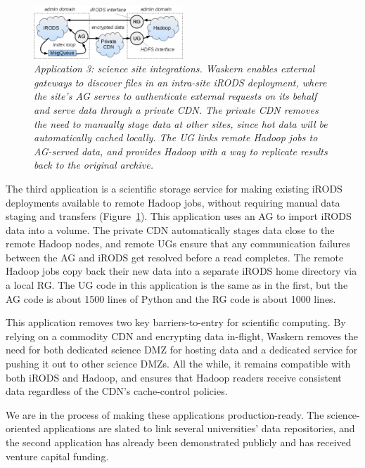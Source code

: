 \begin{figure}[t!]
\centering
\includegraphics[width=0.5\textwidth]{figures/irods-hadoop}
\caption{\it Application 3: science site integrations.  Waskern enables external
   gateways to discover files in an intra-site iRODS deployment, where the
   site's AG serves to authenticate external requests on its behalf and serve
   data through a private CDN.  The private CDN removes the need to manually
   stage data at other sites, since hot data will be automatically cached
   locally.  The UG links remote Hadoop jobs to AG-served data, and provides
   Hadoop with a way to replicate results back to the original archive.}
\label{fig:irods-hadoop}
\end{figure}

The third application is a scientific storage service for making existing iRODS
deployments available to remote Hadoop jobs, without requiring manual data
staging and transfers (Figure~\ref{fig:irods-hadoop}). This application
uses an AG to import iRODS data into a volume. The private
CDN automatically stages data close to the remote Hadoop nodes, and remote UGs
ensure that any communication failures between the AG and iRODS get resolved
before a read completes. The remote Hadoop jobs copy back their new data into a
separate iRODS home directory via a local RG. The UG code in this application is
the same as in the first, but the AG code is about 1500 lines of Python and the RG
code is about 1000 lines.

This application removes two key barriers-to-entry for scientific computing.  By
relying on a commodity CDN and encrypting data in-flight, Waskern removes the
need for both dedicated science DMZ for hosting data and a dedicated service for
pushing it out to other science DMZs.  All the while, it remains compatible with
both iRODS and Hadoop, and ensures that Hadoop readers receive consistent data
regardless of the CDN's cache-control policies.

We are in the process of making these applications production-ready.  The
science-oriented applications are slated to link several universities' data repositories, and
the second application has already been demonstrated publicly and has received venture capital funding.


